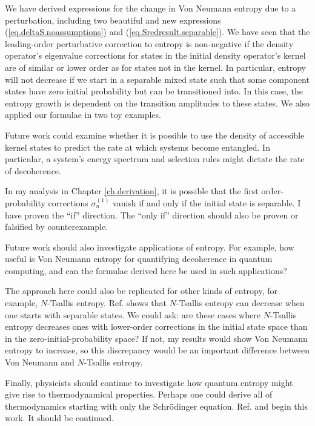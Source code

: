 We have derived expressions for the change in Von Neumann entropy due to a perturbation, including two beautiful and new expressions (\ref{eq.deltaS.noassumptions}) and (\ref{eq.Sredresult.separable}). We have seen that the leading-order perturbative correction to entropy is non-negative if the density operator's eigenvalue corrections for states in the initial density operator's kernel are of similar or lower order as for states not in the kernel. In particular, entropy will not decrease if we start in a separable mixed state such that some component states have zero initial probability but can be transitioned into. In this case, the entropy growth is dependent on the transition amplitudes to these states. We also applied our formulae in two toy examples.

Future work could examine whether it is possible to use the density of accessible kernel states to predict the rate at which systems become entangled. In particular, a system’s energy spectrum and selection rules might dictate the rate of decoherence.

In my analysis in Chapter \ref{ch.derivation}, it is possible that the first order-probability corrections \(\sigma_n^{(1)}\) vanish if and only if the initial state is separable. I have proven the ``if'' direction. The ``only if'' direction should also be proven or falsified by counterexample.

Future work should also investigate applications of entropy. For example, how useful is Von Neumann entropy for quantifying decoherence in quantum computing, and can the formulae derived here be used in such applications? 

The approach here could also be replicated for other kinds of entropy, for example, \(N\)-Tsallis entropy. Ref. \cite{cheung} shows that \(N\)-Tsallis entropy can decrease when one starts with separable states. We could ask: are these cases where \(N\)-Tsallis entropy decreases ones with lower-order corrections in the initial state space than in the zero-initial-probability space? If not, my results would show Von Neumann entropy to increase, so this discrepancy would be an important difference between Von Neumann and \(N\)-Tsallis entropy.

Finally, physicists should continue to investigate how quantum entropy might give rise to thermodynamical properties. Perhaps one could derive all of thermodynamics starting with only the Schrödinger equation. Ref. \cite{bracken} and \cite{heusler} begin this work. It should be continued.
